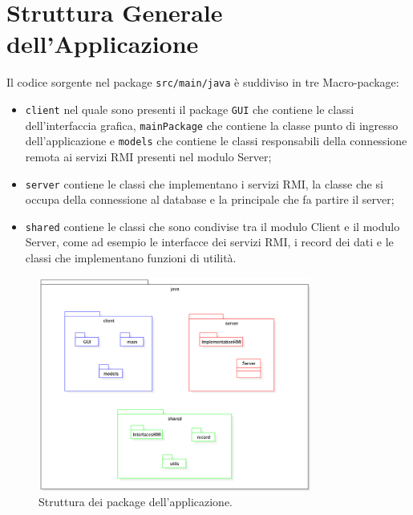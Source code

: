 \NoBgThispage
\section{Struttura Generale dell'Applicazione}
Il codice sorgente nel package \texttt{src/main/java} è suddiviso in tre Macro-package:
\begin{itemize}
    \item \texttt{client} nel quale sono presenti il package \texttt{GUI} che contiene le classi
          dell'interfaccia grafica, \texttt{mainPackage} che contiene la classe punto di ingresso dell'applicazione e \texttt{models} che contiene le classi responsabili
          della connessione remota ai servizi RMI presenti nel modulo Server;
    \item \texttt{server} contiene le classi che implementano i servizi RMI, la classe che si occupa della connessione al database e la principale che fa
          partire il server;
    \item \texttt{shared} contiene le classi che sono condivise tra il modulo Client e il modulo Server, come ad esempio le interfacce dei servizi RMI,
          i record dei dati e le classi che implementano funzioni di utilità.
\end{itemize}

\begin{figure}[H]
    \centering
    \includegraphics[width=0.8\textwidth]{img/packageStructure.png}
    \caption{Struttura dei package dell'applicazione.}
\end{figure}